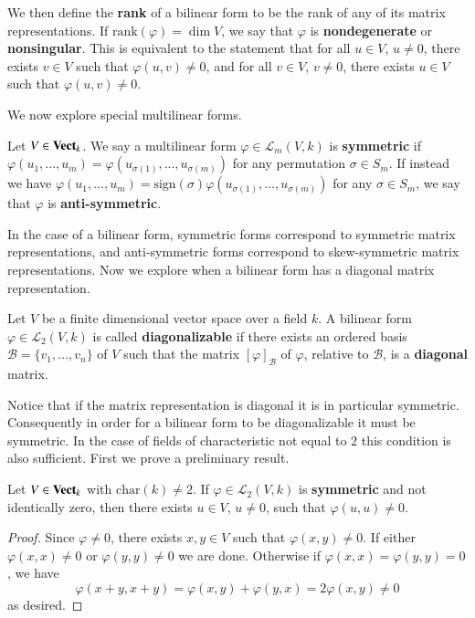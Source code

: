 We then define the \textbf{rank} of a bilinear form to be the rank of any of its matrix representations. If $\text{rank}(\varphi) = \dim V$, we say that $\varphi$ is \textbf{nondegenerate} or \textbf{nonsingular}. This is equivalent to the statement that for all $u \in V$, $u \neq 0$, there exists $v \in V$ such that $\varphi(u,v) \neq 0$, and for all $v \in V$, $v \neq 0$, there exists $u \in V$ such that $\varphi(u,v) \neq 0$.

We now explore special multilinear forms. 
\begin{definition}
    Let $V \in \normalfont\textbf{Vect}_{k}$. We say a multilinear form $\varphi \in \mathcal{L}_m(V,k)$ is \textbf{symmetric} if $\varphi(u_1,...,u_m) = \varphi(u_{\sigma(1)},...,u_{\sigma(m)})$ for any permutation $\sigma \in S_m$. If instead we have $\varphi(u_1,...,u_m) = \text{sign}(\sigma)\varphi(u_{\sigma(1)},...,u_{\sigma(m)})$ for any $\sigma \in S_m$, we say that $\varphi$ is \textbf{anti-symmetric}.
\end{definition}

In the case of a bilinear form, symmetric forms correspond to symmetric matrix representations, and anti-symmetric forms correspond to skew-symmetric matrix representations. Now we explore when a bilinear form has a diagonal matrix representation.

\begin{definition}
    Let $V$ be a finite dimensional vector space over a field $k$. A bilinear form $\varphi \in \mathcal{L}_2(V,k)$ is called \textbf{diagonalizable} if there exists an ordered basis $\mathcal{B} = \{v_1,...,v_n\}$ of $V$ such that the matrix $[\varphi]_{\mathcal{B}}$ of $\varphi$, relative to $\mathcal{B}$, is a \textbf{diagonal} matrix.
\end{definition}

Notice that if the matrix representation is diagonal it is in particular symmetric. Consequently in order for a bilinear form to be diagonalizable it must be symmetric. In the case of fields of characteristic not equal to $2$ this condition is also sufficient. First we prove a preliminary result.

\begin{lemma}
    Let $V \in \normalfont\textbf{Vect}_{k}$ with $\text{char}(k) \neq 2$. If $\varphi \in \mathcal{L}_2(V,k)$ is \textbf{symmetric} and not identically zero, then there exists $u \in V$, $u \neq 0$, such that $\varphi(u,u) \neq 0$.
\end{lemma}
\begin{proof}
    Since $\varphi \neq 0$, there exists $x,y \in V$ such that $\varphi(x,y) \neq 0$. If either $\varphi(x,x) \neq 0$ or $\varphi(y,y) \neq 0$ we are done. Otherwise if $\varphi(x,x) = \varphi(y,y) = 0$, we have \begin{equation*}
        \varphi(x+y,x+y) = \varphi(x,y) + \varphi(y,x) = 2\varphi(x,y) \neq 0
    \end{equation*}
    as desired.
\end{proof}

